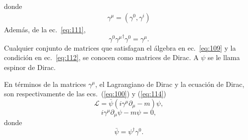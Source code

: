 donde
\begin{align}
  \gamma^\mu=(\gamma^0,\gamma^i)
\end{align}
Adem\'as, de la ec.~\eqref{eq:111},
\begin{equation}
  \label{eq:112}
   \gamma^0{\gamma^\mu}^\dagger \gamma^0=\gamma^\mu.
\end{equation}
Cualquier conjunto de matrices que satisfagan el \'algebra en ec.~\eqref{eq:109} y la condici\'on en ec.~\eqref{eq:112}, se conocen como matrices de Dirac. A $\psi$ se le llama espinor de Dirac.

En t\'erminos de la matrices $\gamma^\mu$, el Lagrangiano de Dirac y la ecuaci\'on de Dirac, son respectivamente de las ecs.~(\ref{eq:100}) y (\ref{eq:114})
\begin{equation}
  \label{eq:115}
  \mathcal{L}=\bar{\psi}\left(i\gamma^\mu\partial_\mu-m\right)\psi,
\end{equation}
\begin{equation}
  \label{eq:116}
  i\gamma^\mu\partial_\mu\psi-m\psi=0,
\end{equation}
donde
\begin{equation}
  \bar{\psi}=\psi^\dagger\gamma^0.
\end{equation}

